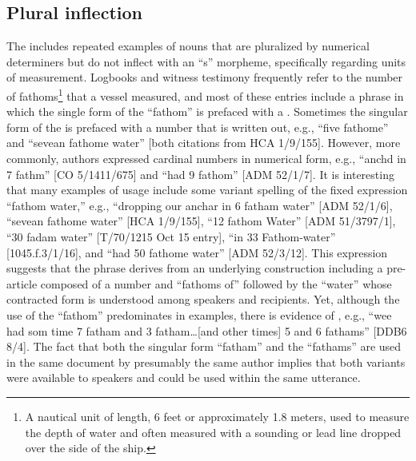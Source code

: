 \subsection{{Plural inflection}}\label{sec:5.2.3}

The  includes repeated examples of nouns that are pluralized by numerical determiners but do not inflect with an “s” morpheme, specifically regarding units of measurement. Logbooks and witness testimony frequently refer to the number of fathoms\footnote{A nautical unit of length, 6 feet or approximately 1.8 meters, used to measure the depth of water and often measured with a sounding or lead line dropped over the side of the ship.} that a vessel measured, and most of these entries include a phrase in which the single form of the  “fathom” is prefaced with a . Sometimes the singular form of the  is prefaced with a number that is written out, e.g., “five fathome” and “sevean fathome water” [both citations from HCA 1/9/155]. However, more commonly, authors expressed cardinal numbers in numerical form, e.g., “anchd in 7 fathm” [CO 5/1411/675] and “had 9 fathom” [ADM 52/1/7]. It is interesting that many examples of usage include some variant spelling of the fixed expression “fathom water,” e.g., “dropping our anchar in 6 fatham water” [ADM 52/1/6], “sevean fathome water” [HCA 1/9/155], “12 fathom Water” [ADM 51/3797/1], “30 fadam water” [T/70/1215 Oct 15 entry], “in 33 Fathom-water” [1045.f.3/1/16], and “had 50 fathome water” [ADM 52/3/12]. This expression suggests that the phrase derives from an underlying construction including a pre-article composed of a number and “fathoms of” followed by the  “water” whose contracted form is understood among speakers and recipients. Yet, although the use of the   “fathom” predominates in  examples, there is evidence of , e.g., “wee had som time 7 fatham and 3 fatham…[and other times] 5 and 6 fathams” [DDB6 8/4]. The fact that both the singular form “fatham” and the  “fathams” are used in the same document by presumably the same author implies that both variants were available to speakers and could be used within the same utterance. 

